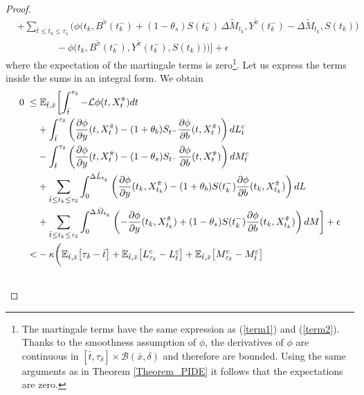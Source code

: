 \begin{proof}
\begin{align}
    & + \sum_{\bar t \leq t_k \leq \tau_{\delta}} \biggl( \phi \bigl( t_k, B^{\tilde \pi}(t_k^-) + (1-\theta_s) S(t_k^-)\, \Delta \tilde M_{t_k}, Y^{\tilde \pi}(t_k^-) 
      - \Delta \tilde M_{t_k}, S(t_k) \bigr) \\ \nonumber
    & \hspace{4em} - \phi \bigl(t_k, B^{\tilde \pi}(t_k^-), Y^{\tilde \pi}(t_k^-), S(t_k) \bigr) \biggr) \biggr] + \epsilon
\end{align}
where the expectation of the martingale terms is zero\footnote{
The martingale terms have the same expression as (\ref{term1}) and (\ref{term2}). 
Thanks to the smoothness assumption of $\phi$, the derivatives of $\phi$ are continuous in $[\bar t, \tau_{\delta}] \times \mathcal{B}(\bar x, \delta)$ and therefore are bounded.
Using the same arguments as in Theorem \ref{Theorem_PIDE} it follows that the expectations are zero. }. 
Let us express the terms inside the sums in an integral form. We obtain
\begin{align}\label{second_inequality}
 0 \; \leq & \; \E_{\bar t, \bar x} \biggl[ \int_{\bar t}^{\tau_{\delta}} -\LL \phi(t,X^{\tilde \pi}_t) dt \\ \nonumber
    & + \int_{\bar t}^{\tau_{\delta}} \left(\frac{\partial \phi}{\partial y}(t, X^{\tilde \pi}_t) -(1+\theta_b) S_{t^-} \frac{\partial \phi}{\partial b}( t, X^{\tilde \pi}_t)\right) dL^c_t \\ \nonumber
    & - \int_{\bar t}^{\tau_{\delta}} \left(\frac{\partial \phi}{\partial y}( t, X^{\tilde \pi}_t)-(1-\theta_s) S_{t^-} \frac{\partial \phi}{\partial b}( t, X^{\tilde \pi}_t)\right) dM^c_t \\ \nonumber
    & + \sum_{\bar t \leq t_k \leq \tau_{\delta}} \int_{0}^{\Delta \tilde L_{t_k}} \left(\frac{\partial \phi}{\partial y}(t_k, X^{\tilde \pi}_{t_k}) -(1+\theta_b) S(t_k^-) 
                  \frac{\partial \phi}{\partial b}( t_k, X^{\tilde \pi}_{t_k})\right) dL \\ \nonumber 
    & + \sum_{\bar t \leq t_k \leq \tau_{\delta}} \int_{0}^{\Delta \tilde M_{t_k}} \left(-\frac{\partial \phi}{\partial y}( t_k, X^{\tilde \pi}_{t_k})+(1-\theta_s) S(t_k^-) 
      \frac{\partial \phi}{\partial b}( t_k, X^{\tilde \pi}_{t_k})\right) dM \biggr] + \epsilon \\ \nonumber
  < & -\kappa \biggl( \E_{\bar t, \bar x} \bigl[ \tau_{\delta} - \bar t \bigr] + \E_{\bar t, \bar x} \bigl[ L^c_{\tau_{\delta}} - L^c_{\bar t} \bigr]  
    + \E_{\bar t, \bar x} \bigl[ M^c_{\tau_{\delta}}-M^c_{\bar t} \bigr] \\ \nonumber 

\end{align}
\end{proof}
